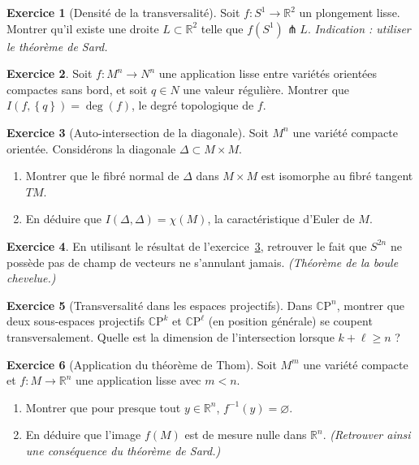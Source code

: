 \documentclass[12pt,a4paper,openany]{book}
\theoremstyle{definition}
\newtheorem{exercice}{Exercice}[chapter]
\theoremstyle{plain}
\theoremstyle{remark}
\newcommand{\R}{\mathbb{R}}
\newcommand{\CP}{\mathbb{C}\mathrm{P}}
\newcommand{\set}[1]{\left\{#1\right\}}
\begin{document}
\begin{exercice}[Densité de la transversalité]\label{exo:densite-transversalite}
Soit $f \colon S^1 \to \R^2$ un plongement lisse. Montrer qu'il existe
une droite $L \subset \R^2$ telle que $f(S^1) \pitchfork L$.
\textit{Indication : utiliser le théorème de Sard.}
\end{exercice}

\begin{exercice}\label{exo:nombre-intersection-degre}
Soit $f \colon M^n \to N^n$ une application lisse entre variétés
orientées compactes sans bord, et soit $q \in N$ une valeur régulière.
Montrer que $I(f, \set{q}) = \deg(f)$, le degré topologique de $f$.
\end{exercice}

\begin{exercice}[Auto-intersection de la diagonale]\label{exo:auto-intersection-diag}
Soit $M^n$ une variété compacte orientée. Considérons la diagonale
$\Delta \subset M \times M$.
\begin{enumerate}[label=\textup{(\alph*)}]
  \item Montrer que le fibré normal de $\Delta$ dans $M \times M$ est
    isomorphe au fibré tangent $TM$.
  \item En déduire que $I(\Delta, \Delta) = \chi(M)$, la
    caractéristique d'Euler de $M$.
\end{enumerate}
\end{exercice}

\begin{exercice}\label{exo:hairy-ball}
En utilisant le résultat de l'exercice~\ref{exo:auto-intersection-diag},
retrouver le fait que $S^{2n}$ ne possède pas de champ de vecteurs ne
s'annulant jamais. \textit{(Théorème de la boule chevelue.)}
\end{exercice}

\begin{exercice}[Transversalité dans les espaces projectifs]%
\label{exo:transverse-projectif}
Dans $\CP^n$, montrer que deux sous-espaces projectifs
$\CP^k$ et $\CP^\ell$ (en position générale) se coupent transversalement.
Quelle est la dimension de l'intersection lorsque $k + \ell \geq n$ ?
\end{exercice}

\begin{exercice}[Application du théorème de Thom]\label{exo:application-thom}
Soit $M^m$ une variété compacte et $f \colon M \to \R^n$ une application
lisse avec $m < n$.
\begin{enumerate}[label=\textup{(\alph*)}]
  \item Montrer que pour presque tout $y \in \R^n$, $f^{-1}(y) = \varnothing$.
  \item En déduire que l'image $f(M)$ est de mesure nulle dans $\R^n$.
    \textit{(Retrouver ainsi une conséquence du théorème de Sard.)}
\end{enumerate}
\end{exercice}
\end{document}
